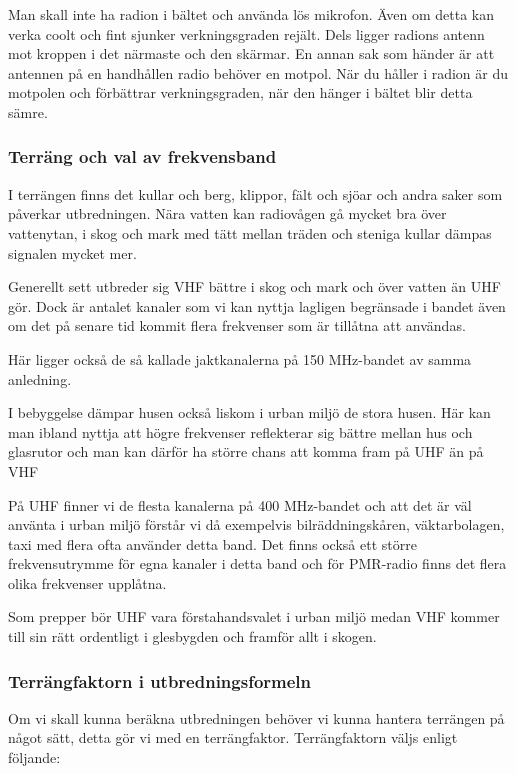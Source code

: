 Man skall inte ha radion i bältet och använda lös mikrofon. Även om detta kan verka coolt och fint sjunker verkningsgraden rejält. Dels ligger radions antenn mot kroppen i det närmaste och den skärmar. En annan sak som händer är att antennen på en handhållen radio behöver en motpol. När du håller i radion är du motpolen och förbättrar verkningsgraden, när den hänger i bältet blir detta sämre.

\subsubsection{Terräng och val av frekvensband}

I terrängen finns det kullar och berg, klippor, fält och sjöar och andra saker som påverkar utbredningen. Nära vatten kan radiovågen gå mycket bra över vattenytan, i skog och mark med tätt mellan träden och steniga kullar dämpas signalen mycket mer.

Generellt sett utbreder sig VHF bättre i skog och mark och över vatten än UHF gör. Dock är antalet kanaler som vi kan nyttja lagligen begränsade i bandet även om det på senare tid kommit flera frekvenser som är tillåtna att användas.

Här ligger också de så kallade jaktkanalerna på 150 MHz-bandet av samma anledning.

I bebyggelse dämpar husen också liskom i urban miljö de stora husen. Här kan man ibland nyttja att högre frekvenser reflekterar sig bättre mellan hus och glasrutor och man kan därför ha större chans att komma fram på UHF än på VHF

På UHF finner vi de flesta kanalerna på 400 MHz-bandet och att det är väl använta i urban miljö förstår vi då exempelvis bilräddningskåren, väktarbolagen, taxi med flera ofta använder detta band. Det finns också ett större frekvensutrymme för egna kanaler i detta band och för PMR-radio finns det flera olika frekvenser upplåtna.

Som prepper bör UHF vara förstahandsvalet i urban miljö medan VHF kommer till sin rätt ordentligt i glesbygden och framför allt i skogen.

\subsubsection{Terrängfaktorn i utbredningsformeln}

Om vi skall kunna beräkna utbredningen behöver vi kunna hantera terrängen på något sätt, detta gör vi med en terrängfaktor. Terrängfaktorn väljs enligt följande:

